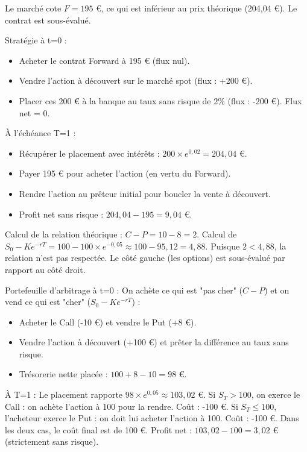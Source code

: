 \begin{correctionbox}
Le marché cote $F = 195$ €, ce qui est inférieur au prix théorique (204,04 €). Le contrat est sous-évalué.

Stratégie à t=0 :
\begin{itemize}[label=$\cdot$]
    \item Acheter le contrat Forward à 195 € (flux nul).
    \item Vendre l'action à découvert sur le marché spot (flux : +200 €).
    \item Placer ces 200 € à la banque au taux sans risque de 2\% (flux : -200 €). Flux net = 0.
\end{itemize}
À l'échéance T=1 :
\begin{itemize}[label=$\cdot$]
    \item Récupérer le placement avec intérêts : $200 \times e^{0,02} = 204,04$ €.
    \item Payer 195 € pour acheter l'action (en vertu du Forward).
    \item Rendre l'action au prêteur initial pour boucler la vente à découvert.
    \item Profit net sans risque : $204,04 - 195 = 9,04$ €.
\end{itemize}
\end{correctionbox}

\begin{correctionbox}
Calcul de la relation théorique : $C - P = 10 - 8 = 2$.
Calcul de $S_0 - K e^{-rT} = 100 - 100 \times e^{-0,05} \approx 100 - 95,12 = 4,88$.
Puisque $2 < 4,88$, la relation n'est pas respectée. Le côté gauche (les options) est sous-évalué par rapport au côté droit.

Portefeuille d'arbitrage à t=0 :
On achète ce qui est "pas cher" ($C - P$) et on vend ce qui est "cher" ($S_0 - K e^{-rT}$) :
\begin{itemize}[label=$\cdot$]
    \item Acheter le Call (-10 €) et vendre le Put (+8 €).
    \item Vendre l'action à découvert (+100 €) et prêter la différence au taux sans risque.
    \item Trésorerie nette placée : $100 + 8 - 10 = 98$ €.
\end{itemize}
À T=1 :
Le placement rapporte $98 \times e^{0,05} \approx 103,02$ €.
Si $S_T > 100$, on exerce le Call : on achète l'action à 100 pour la rendre. Coût : -100 €.
Si $S_T \le 100$, l'acheteur exerce le Put : on doit lui acheter l'action à 100. Coût : -100 €.
Dans les deux cas, le coût final est de 100 €.
Profit net : $103,02 - 100 = 3,02$ € (strictement sans risque).
\end{correctionbox}

